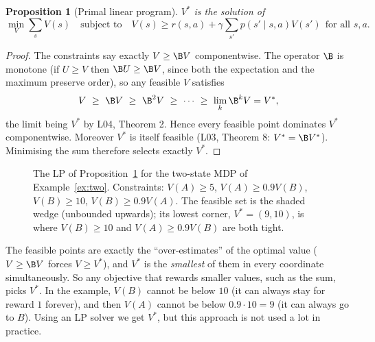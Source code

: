 \documentclass[11pt,a4paper]{article}
\theoremstyle{plain}
\newtheorem{proposition}[theorem]{Proposition}
\theoremstyle{definition}
\theoremstyle{remark}
\begin{document}
\begin{proposition}[Primal linear program]\label{prop:lp}
$V^*$ is the solution of
\[
\min_V\sum_sV(s)\quad\text{subject to}\quad V(s)\ge r(s,a)+\gamma\sum_{s'}p(s'\mid s,a)V(s')\ \ \text{for all }s,a.
\]
\end{proposition}
\begin{proof}
The constraints say exactly $V\ge\B V$ componentwise. The operator $\B$ is monotone (if $U\ge V$ then $\B U\ge\B V$, since both the expectation and the maximum preserve order), so any feasible $V$ satisfies
\[
V\ \ge\ \B V\ \ge\ \B^2V\ \ge\ \cdots\ \ge\ \lim_k\B^kV=V^*,
\]
the limit being $V^*$ by L04, Theorem 2. Hence every feasible point dominates $V^*$ componentwise. Moreover $V^*$ is itself feasible (L03, Theorem 8: $V^*=\B V^*$). Minimising the sum therefore selects exactly $V^*$.
\end{proof}

\begin{figure}[h]
\centering
{}
\caption{The LP of Proposition~\ref{prop:lp} for the two-state MDP of Example~\ref{ex:two}. Constraints: $V(A)\ge5$, $V(A)\ge0.9V(B)$, $V(B)\ge10$, $V(B)\ge0.9V(A)$. The feasible set is the shaded wedge (unbounded upwards); its lowest corner, $V^*=(9,10)$, is where $V(B)\ge10$ and $V(A)\ge0.9V(B)$ are both tight.}
\end{figure}

\begin{intuition}
The feasible points are exactly the ``over-estimates'' of the optimal value ($V\ge\B V$ forces $V\ge V^*$), and $V^*$ is the \emph{smallest} of them in every coordinate simultaneously. So any objective that rewards smaller values, such as the sum, picks $V^*$. In the example, $V(B)$ cannot be below $10$ (it can always stay for reward $1$ forever), and then $V(A)$ cannot be below $0.9\cdot10=9$ (it can always go to $B$). Using an LP solver we get $V^*$, but this approach is not used a lot in practice.
\end{intuition}
\end{document}
